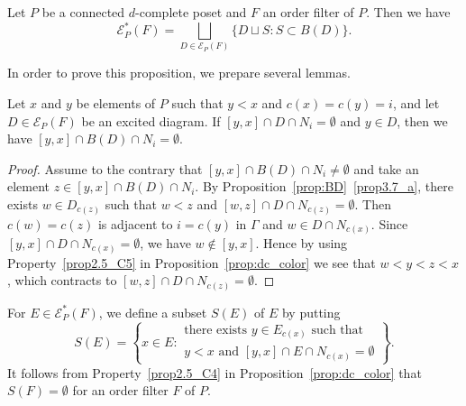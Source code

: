 \documentclass[ALCO,ThmDefs,Unicode,epreuves]{cedram}
\newcommand\EE{\mathcal{E}}
\begin{document}
\begin{prop}
\label{prop:E*}
Let $P$ be a connected $d$-complete poset and $F$ an order filter of $P$.
Then we have
\begin{equation}
\label{eq:E*}
\EE^*_P(F) = \bigsqcup_{D \in \EE_P(F)} \{ D \sqcup S : S \subset B(D) \}.
\end{equation}
\end{prop}

In order to prove this proposition, we prepare several lemmas.

\begin{lemm}
\label{lem:interval_BD}
Let $x$ and $y$ be elements of $P$ such that $y<x$ and $c(x) = c(y) = i$, 
and let $D\in \EE_P(F)$ be an excited diagram.
If $[y,x] \cap D \cap N_i = \emptyset$ and $y \in D$, 
then we have $[y,x] \cap B(D) \cap N_i = \emptyset$.
\end{lemm}

\begin{proof}
Assume to the contrary that $[y,x] \cap B(D) \cap N_i \neq \emptyset$ 
and take an element $z \in [y,x] \cap B(D) \cap N_i$.
By Proposition~\ref{prop:BD}~\ref{prop3.7_a}, there exists $w \in D_{c(z)}$ such that 
$w < z$ and $[w,z] \cap D \cap N_{c(z)} = \emptyset$.
Then $c(w) = c(z)$ is adjacent to $i = c(y)$ in $\Gamma$ and $w \in D \cap N_{c(x)}$.
Since $[y,x] \cap D \cap N_{c(x)} = \emptyset$, we have $w \not\in [y,x]$.
Hence by using Property~\ref{prop2.5_C5} in Proposition~\ref{prop:dc_color} 
we see that $w < y < z < x$, which contracts to $[w,z] \cap D \cap N_{c(z)} = \emptyset$.
\end{proof}

For $E \in \EE^*_P(F)$, we define a subset $S(E)$ of $E$ by putting
\begin{equation}
\label{eq:def_SE}
S(E)
 = 
\left\{
x \in E :
\begin{matrix}
\text{there exists $y \in E_{c(x)}$ such that } \\
\text{$y<x$ and $[y,x] \cap E \cap N_{c(x)} = \emptyset$}
\end{matrix}
\right\}.
\end{equation}
It follows from Property~\ref{prop2.5_C4} in Proposition~\ref{prop:dc_color} that $S(F) = \emptyset$ 
for an order filter $F$ of $P$.
\end{document}

